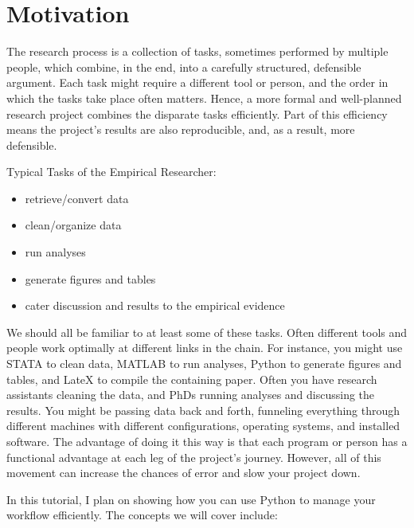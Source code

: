 \documentclass{article}
\begin{document}
\section*{Motivation}

The research process is a collection of tasks, sometimes performed by multiple 
people, which combine, in the end, into a carefully structured, defensible 
argument. Each task might require a different tool or person, and the 
order in which the tasks take place often matters. Hence, a more formal 
and well-planned research project combines the disparate tasks efficiently. 
Part of this efficiency means the project's results are also reproducible, 
and, as a result, more defensible. 

Typical Tasks of the Empirical Researcher:

\begin{itemize}
\item retrieve/convert data
\item clean/organize data
\item run analyses
\item generate figures and tables
\item cater discussion and results to the empirical evidence
\end{itemize}

We should all be familiar to at least some of these tasks. Often different
tools and people work optimally at different links in the chain. For instance, 
you might use STATA to clean data, MATLAB to run analyses, Python to 
generate figures and tables, and LateX to compile the containing paper. 
Often you have research assistants cleaning the data, and PhDs running analyses and 
discussing the results. You might be passing data back and forth, funneling 
everything through different machines with different configurations, operating 
systems, and installed software. The advantage of doing it this way is that each 
program or person has a functional advantage at each leg of the project's journey. 
However, all of this movement can increase the chances of error and slow your project
down.

In this tutorial, I plan on showing how you can use Python to manage your workflow
efficiently. The concepts we will cover include:
\end{document}
